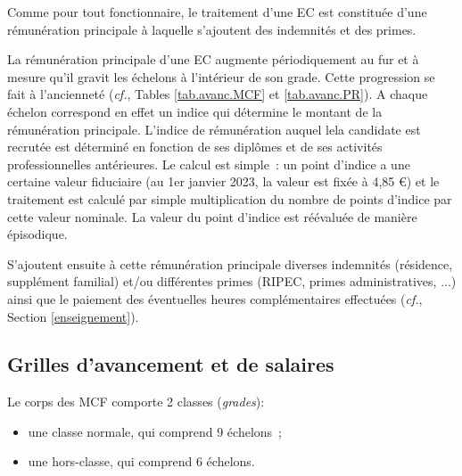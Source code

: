Comme pour tout fonctionnaire, le traitement d'un\mp e EC est constitu\'ee
d'une r\'emun\'eration principale \`a laquelle s'ajoutent des indemnit\'es et des primes.

La r\'emun\'eration principale d'un\mp e EC augmente
p\'e\-rio\-di\-quement au fur et \`a mesure qu'il gravit les
\'echelons \`a l'int\'erieur de son grade. Cette progression se fait \`a l'anciennet\'e ({\em cf.}, Tables \ref{tab.avanc.MCF} et \ref{tab.avanc.PR}).
A chaque \'echelon correspond en effet un indice qui d\'etermine le montant de la
r\'emun\'eration principale. L'indice de r\'emun\'eration auquel le\mp la candidat\mp e est recrut\'e\mp e est d\'etermin\'e en fonction de ses dipl\^omes et de ses activit\'es professionnelles ant\'erieures. Le calcul est simple~: un point
d'indice a une certaine valeur fiduciaire (au 1er janvier 2023, la valeur est fix\'ee \`a 4,85 \euro) et le traitement est
calcul\'e par simple multiplication du nombre de points d'indice par
cette valeur nominale. La valeur du point d'indice est
r\'e\'evalu\'ee de mani\`ere \'episodique.

S'ajoutent ensuite \`a cette r\'emun\'eration principale diverses indemnit\'es
(r\'esidence, suppl\'ement familial)
et/ou diff\'erentes primes (RIPEC, primes administratives, ...)
ainsi que le paiement des \'eventuelles heures compl\'emen\-taires effectu\'ees
({\em cf.}, Section \ref{enseignement}).


\subsection{Grilles d'avancement et de salaires}\label{sec. grilles}

Le corps des MCF comporte 2 classes
(\textit{grades}):
\begin{itemize}
\item une classe normale, qui comprend 9 \'echelons~;
\item une hors-classe, qui comprend 6 \'echelons.
\end{itemize}

